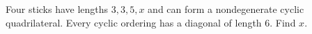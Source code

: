 Four sticks have lengths $3,3,5,x$ and can form a nondegenerate cyclic quadrilateral. Every cyclic ordering has a diagonal of length 6. Find $x$.
